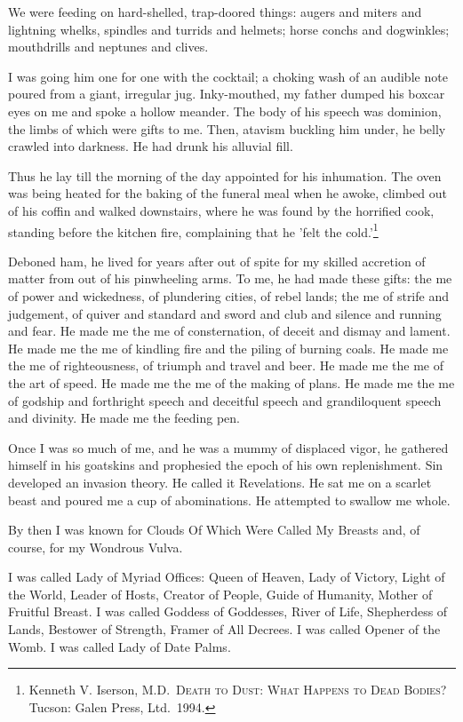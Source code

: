 \documentclass[
]{memoir}
\begin{document}
We were feeding on hard-shelled, trap-doored things: augers and miters
and lightning whelks, spindles and turrids and helmets; horse conchs and
dogwinkles; mouthdrills and neptunes and clives.

I was going him one for one with the cocktail; a choking wash of an
audible note poured from a giant, irregular jug. Inky-mouthed, my father
dumped his boxcar eyes on me and spoke a hollow meander. The body of his
speech was dominion, the limbs of which were gifts to me. Then, atavism
buckling him under, he belly crawled into darkness. He had drunk his
alluvial fill.

Thus he lay till the morning of the day appointed for his inhumation.
The oven was being heated for the baking of the funeral meal when he
awoke, climbed out of his coffin and walked downstairs, where he was
found by the horrified cook, standing before the kitchen fire,
complaining that he 'felt the cold.'\footnote{Kenneth V. Iserson,
  M.D.~\textsc{Death to Dust: What Happens to Dead Bodies?} Tucson:
  Galen Press, Ltd.~1994.}

Deboned ham, he lived for years after out of spite for my skilled
accretion of matter from out of his pinwheeling arms. To me, he had made
these gifts: the me of power and wickedness, of plundering cities, of
rebel lands; the me of strife and judgement, of quiver and standard and
sword and club and silence and running and fear. He made me the me of
consternation, of deceit and dismay and lament. He made me the me of
kindling fire and the piling of burning coals. He made me the me of
righteousness, of triumph and travel and beer. He made me the me of the
art of speed. He made me the me of the making of plans. He made me the
me of godship and forthright speech and deceitful speech and
grandiloquent speech and divinity. He made me the feeding pen.

Once I was so much of me, and he was a mummy of displaced vigor, he
gathered himself in his goatskins and prophesied the epoch of his own
replenishment. Sin developed an invasion theory. He called it
Revelations. He sat me on a scarlet beast and poured me a cup of
abominations. He attempted to swallow me whole.

By then I was known for Clouds Of Which Were Called My Breasts and, of
course, for my Wondrous Vulva.

I was called Lady of Myriad Offices: Queen of Heaven, Lady of Victory,
Light of the World, Leader of Hosts, Creator of People, Guide of
Humanity, Mother of Fruitful Breast. I was called Goddess of Goddesses,
River of Life, Shepherdess of Lands, Bestower of Strength, Framer of All
Decrees. I was called Opener of the Womb. I was called Lady of Date
Palms.
\end{document}

